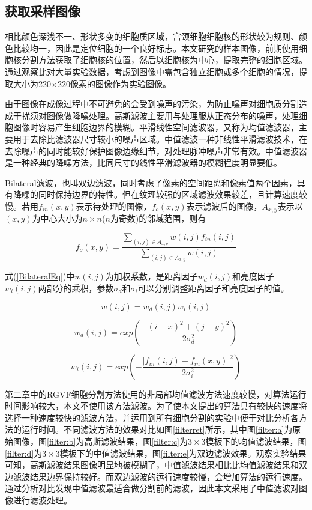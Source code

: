 \documentclass[nomlist,masters]{seuthesix}
\begin{document}
\subsection{获取采样图像}
相比颜色深浅不一、形状多变的细胞质区域，宫颈细胞细胞核的形状较为规则、颜色比较均一，因此是定位细胞的一个良好标志。本文研究的样本图像，前期使用细胞核分割方法获取了细胞核的位置，然后以细胞核为中心，提取完整的细胞区域。通过观察比对大量实验数据，考虑到图像中需包含独立细胞或多个细胞的情况，提取大小为220$\times$220像素的图像作为实验图像。

由于图像在成像过程中不可避免的会受到噪声的污染，为防止噪声对细胞质分割造成干扰须对图像做降噪处理。高斯滤波主要用与处理服从正态分布的噪声，处理细胞图像时容易产生细胞边界的模糊。平滑线性空间滤波器，又称为均值滤波器，主要用于去除比滤波器尺寸较小的噪声区域。中值滤波一种非线性平滑滤波技术，在去除噪声的同时能较好保护图像边缘细节，对处理脉冲噪声非常有效。中值滤波器是一种经典的降噪方法，比同尺寸的线性平滑滤波器的模糊程度明显要低。

Bilateral滤波\cite{Tomasi1998Bilateral}，也叫双边滤波，同时考虑了像素的空间距离和像素值两个因素，具有降噪的同时保持边界的特性。但在纹理较强的区域滤波效果较差，且计算速度较慢。若用$f_{in}(x,y)$表示待处理的图像，$f_{o}(x,y)$表示滤波后的图像，$A_{x,y}$表示以$(x,y)$为中心大小为$n\times n$($n$为奇数)的邻域范围，则有

\begin{equation}
f_{o}(x,y)=\frac{\sum\limits_{(i,j)\in A_{x,y}}w(i,j)f_{in}(i,j)}{\sum\limits_{(i,j)\in A_{x,y}}w(i,j)}
\label{BilateralEq}
\end{equation}

式(\ref{BilateralEq})中$w(i,j)$为加权系数，是距离因子$w_{d}(i,j)$和亮度因子$w_{i}(i,j)$两部分的乘积，参数$\sigma _{d}$和$\sigma _{i}$可以分别调整距离因子和亮度因子的值。

\begin{equation}
w(i,j)=w_{d}(i,j)w_{i}(i,j)
\label{BilateralW}
\end{equation}

\begin{equation}
w_{d}(i,j)=exp\left ( -\frac{(i-x)^{2}+(j-y)^{2}}{2\sigma _{d}^{2}} \right )
\label{BilateralWd}
\end{equation}

\begin{equation}
w_{i}(i,j)=exp\left ( -\frac{\left | f_{in}(i,j)-f_{in}(x,y) \right |^{2}}{2\sigma _{i}^{2}} \right )
\label{BilateralWi}
\end{equation}

第二章中的RGVF细胞分割方法使用的非局部均值滤波方法速度较慢，对算法运行时间影响较大，本文不使用该方法滤波。为了使本文提出的算法具有较快的速度将选择一种速度较快的滤波方法，并运用到所有细胞分割的实验中便于对比分析各方法的运行时间。不同滤波方法的效果对比如图\ref{filterret}所示，其中图\ref{filter:a}为原始图像，图\ref{filter:b}为高斯滤波结果，图\ref{filter:c}为$3\times 3$模板下的均值滤波结果，图\ref{filter:d}为$3\times 3$模板下的中值滤波结果，图\ref{filter:e}为双边滤波效果。观察实验结果可知，高斯滤波结果图像明显地被模糊了，中值滤波结果相比比均值滤波结果和双边滤波结果边界保持较好。而双边滤波的运行速度较慢，会增加算法的运行速度。通过分析对比发现中值滤波最适合做分割前的滤波，因此本文采用了中值滤波对图像进行滤波处理。
\end{document}
